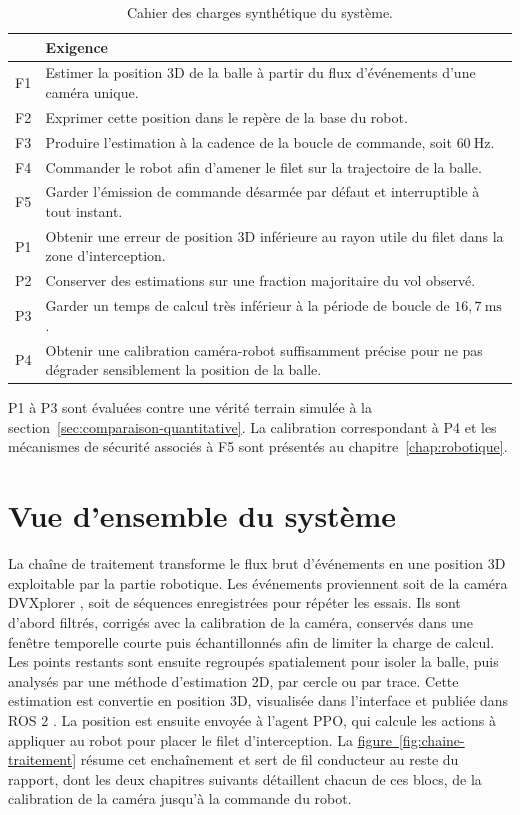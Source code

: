 \documentclass[a4paper,11pt]{report}
\newcommand{\figref}[1]{\hyperref[#1]{figure~\ref*{#1}}}
\begin{document}
\begin{table}[H]
  \centering
  \caption{Cahier des charges synthétique du système.}
  \label{tab:cahier-des-charges}
  \small
  \begin{tabular}{L{0.07\textwidth}L{0.83\textwidth}}
    \toprule
    & Exigence \\
    \midrule
    F1 & Estimer la position 3D de la balle à partir du flux d'événements d'une caméra unique. \\
    F2 & Exprimer cette position dans le repère de la base du robot. \\
    F3 & Produire l'estimation à la cadence de la boucle de commande, soit \(60~\text{Hz}\). \\
    F4 & Commander le robot afin d'amener le filet sur la trajectoire de la balle. \\
    F5 & Garder l'émission de commande désarmée par défaut et interruptible à tout instant. \\
    \midrule
    P1 & Obtenir une erreur de position 3D inférieure au rayon utile du filet dans la zone d'interception. \\
    P2 & Conserver des estimations sur une fraction majoritaire du vol observé. \\
    P3 & Garder un temps de calcul très inférieur à la période de boucle de \(16{,}7~\text{ms}\). \\
    P4 & Obtenir une calibration caméra-robot suffisamment précise pour ne pas dégrader sensiblement la position de la balle. \\
    \bottomrule
  \end{tabular}
\end{table}

P1 à P3 sont évaluées contre une vérité terrain simulée à la
section~\ref{sec:comparaison-quantitative}. La calibration correspondant à P4
et les mécanismes de sécurité associés à F5 sont présentés au
chapitre~\ref{chap:robotique}.


\section{Vue d'ensemble du système}
\label{sec:vue-ensemble}


La chaîne de traitement transforme le flux brut d'événements en une position 3D exploitable par la partie robotique. Les événements proviennent soit de la caméra DVXplorer \cite{inivation-dvxplorer}, soit de séquences enregistrées pour répéter les essais. Ils sont d'abord filtrés, corrigés avec la calibration de la caméra, conservés dans une fenêtre temporelle courte puis échantillonnés afin de limiter la charge de calcul. Les points restants sont ensuite regroupés spatialement pour isoler la balle, puis analysés par une méthode d'estimation 2D, par cercle ou par trace. Cette estimation est convertie en position 3D, visualisée dans l'interface et publiée dans ROS 2 \cite{ros2-docs}. La position est ensuite envoyée à l'agent PPO, qui calcule les actions à appliquer au robot pour placer le filet d'interception. La \figref{fig:chaine-traitement} résume cet enchaînement et sert de fil conducteur au reste du rapport, dont les deux chapitres suivants détaillent chacun de ces blocs, de la calibration de la caméra jusqu'à la commande du robot.
\end{document}
